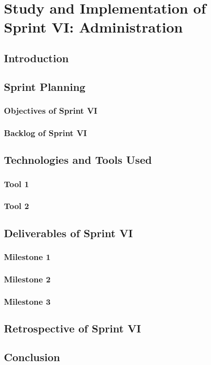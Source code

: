 \documentclass[a4paper,12pt]{report}
\begin{document}
\chapter{Study and Implementation of Sprint VI: Administration}

\section{Introduction}
\section{Sprint Planning}
\subsection{Objectives of Sprint VI}
\subsection{Backlog of Sprint VI}
\section{Technologies and Tools Used}
\subsection{Tool 1}
\subsection{Tool 2}
\section{Deliverables of Sprint VI}
\subsection{Milestone 1}
\subsection{Milestone 2}
\subsection{Milestone 3}
\section{Retrospective of Sprint VI}
\section{Conclusion}
\end{document}
